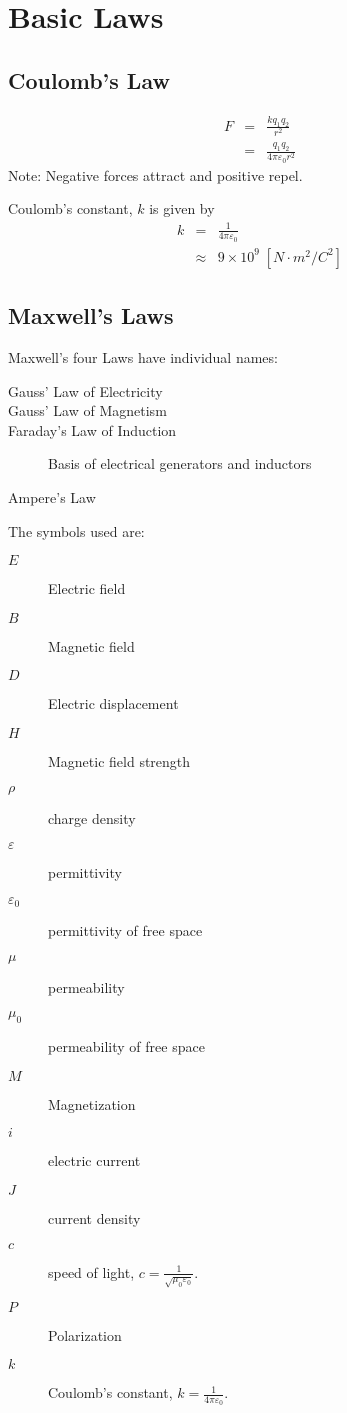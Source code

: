\chapter{Basic Laws}

\section{Coulomb's Law}

\begin{eqnarray}
F
&=& \frac{kq_1q_2}{r^2} \\
&=& \frac{q_1q_2}{4\pi\varepsilon_0r^2}
\end{eqnarray}
Note: Negative forces attract and positive repel.

Coulomb's constant, $k$ is given by
\begin{eqnarray}
k &=& \frac{1}{4\pi\varepsilon_0} \\
&\approx& 9\times 10^9 \;[N\cdot m^2/C^2]
\end{eqnarray}

\section{Maxwell's Laws}

Maxwell's four Laws have individual names:
\begin{description}
  \item[Gauss' Law of Electricity]
  \item[Gauss' Law of Magnetism]
  \item[Faraday's Law of Induction] Basis of electrical generators and inductors
  \item[Ampere's Law]
\end{description}

The symbols used are:
\begin{description}
  \item[$E$] Electric field
  \item[$B$] Magnetic field
  \item[$D$] Electric displacement
  \item[$H$] Magnetic field strength
  \item[$\rho$] charge density
  \item[$\varepsilon$] permittivity
  \item[$\varepsilon_0$] permittivity of free space
  \item[$\mu$] permeability
  \item[$\mu_0$] permeability of free space
  \item[$M$] Magnetization
  \item[$i$] electric current
  \item[$J$] current density
  \item[$c$] speed of light, $c=\frac{1}{\sqrt{\mu_0\varepsilon_0}}$.
  \item[$P$] Polarization
  \item[$k$] Coulomb's constant, $k=\frac{1}{4\pi\varepsilon_0}$.
\end{description}

